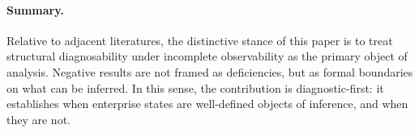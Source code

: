 \paragraph{Summary.}
Relative to adjacent literatures, the distinctive stance of this paper is to treat structural diagnosability under incomplete observability as the primary object of analysis.
Negative results are not framed as deficiencies, but as formal boundaries on what can be inferred.
In this sense, the contribution is diagnostic-first: it establishes when enterprise states are well-defined objects of inference, and when they are not.
